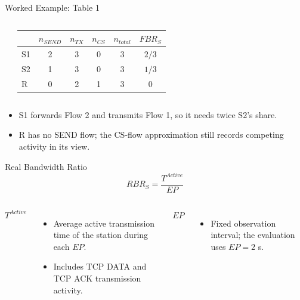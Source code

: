 \begin{frame}{Worked Example: Table 1}
\begin{columns}[T,onlytextwidth]
\begin{center}
\end{center}
\begin{tabular}{lccccc}
\toprule
 & $n_{SEND}$ & $n_{TX}$ & $n_{CS}$ & $n_{total}$ & $FBR_S$\\
\midrule
S1 & 2 & 3 & 0 & 3 & $2/3$\\
S2 & 1 & 3 & 0 & 3 & $1/3$\\
R  & 0 & 2 & 1 & 3 & $0$\\
\bottomrule
\end{tabular}
\end{columns}
\vspace{0.55cm}
\begin{itemize}
\item S1 forwards Flow 2 and transmits Flow 1, so it needs twice S2's share.
\item R has no SEND flow; the CS-flow approximation still records competing activity in its view.
\end{itemize}
\end{frame}

\begin{frame}{Real Bandwidth Ratio}
\small
{}
\[
\boxed{RBR_S=\frac{T^{Active}}{EP}}
\]
\begin{columns}[T,onlytextwidth]
\textbf{$T^{Active}$}
\begin{itemize}
\item Average active transmission time of the station during each $EP$.
\item Includes TCP DATA and TCP ACK transmission activity.
\end{itemize}
\textbf{$EP$}
\begin{itemize}
\item Fixed observation interval; the evaluation uses $EP=2$ s.
\end{itemize}
\end{columns}
\vspace{-0.14cm}
\end{frame}

